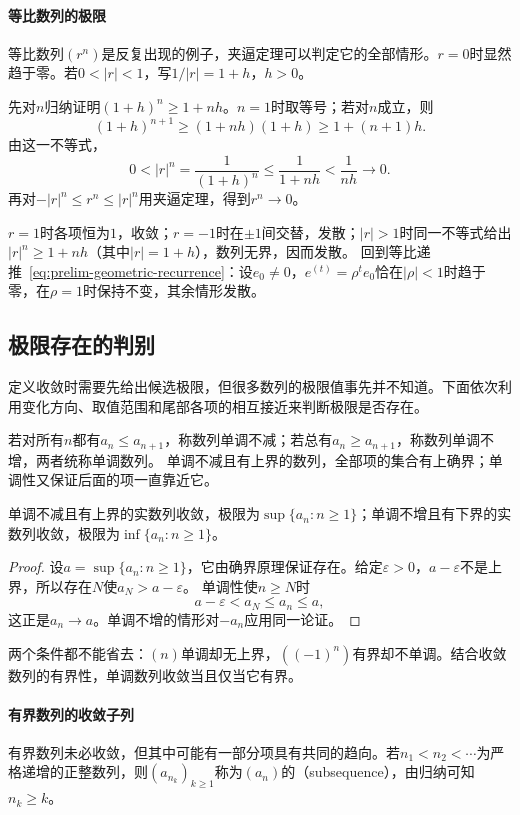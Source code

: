 \paragraph{等比数列的极限}
等比数列$(r^n)$是反复出现的例子，夹逼定理可以判定它的全部情形。$r=0$时显然趋于零。若$0<|r|<1$，写$1/|r|=1+h$，$h>0$。

先对$n$归纳证明$(1+h)^n\geq1+nh$。$n=1$时取等号；若对$n$成立，则
\[
 (1+h)^{n+1}\geq(1+nh)(1+h)\geq1+(n+1)h.
\]
由这一不等式，
\[
 0<|r|^n=\frac1{(1+h)^n}\leq\frac1{1+nh}<\frac1{nh}\to0.
\]
再对$-|r|^n\leq r^n\leq|r|^n$用夹逼定理，得到$r^n\to0$。

$r=1$时各项恒为$1$，收敛；$r=-1$时在$\pm1$间交替，发散；$|r|>1$时同一不等式给出$|r|^n\geq1+nh$（其中$|r|=1+h$），数列无界，因而发散。
回到等比递推~\eqref{eq:prelim-geometric-recurrence}：设$e_0\neq0$，$e^{(t)}=\rho^te_0$恰在$|\rho|<1$时趋于零，在$\rho=1$时保持不变，其余情形发散。

\subsection{极限存在的判别}
\label{sec:ru-limit-existence}

定义收敛时需要先给出候选极限，但很多数列的极限值事先并不知道。下面依次利用变化方向、取值范围和尾部各项的相互接近来判断极限是否存在。

若对所有$n$都有$a_n\leq a_{n+1}$，称数列单调不减；若总有$a_n\geq a_{n+1}$，称数列单调不增，两者统称单调数列。
单调不减且有上界的数列，全部项的集合有上确界；单调性又保证后面的项一直靠近它。
\begin{theorem}[单调有界收敛定理]
\label{thm:analysis-monotone-bounded-sequence}
单调不减且有上界的实数列收敛，极限为$\sup\{a_n:n\geq1\}$；单调不增且有下界的实数列收敛，极限为$\inf\{a_n:n\geq1\}$。
\end{theorem}
\begin{proof}
设$a=\sup\{a_n:n\geq1\}$，它由确界原理保证存在。给定$\varepsilon>0$，$a-\varepsilon$不是上界，所以存在$N$使$a_N>a-\varepsilon$。
单调性使$n\geq N$时
\[
 a-\varepsilon<a_N\leq a_n\leq a,
\]
这正是$a_n\to a$。单调不增的情形对$-a_n$应用同一论证。
\end{proof}
两个条件都不能省去：$(n)$单调却无上界，$((-1)^n)$有界却不单调。结合收敛数列的有界性，单调数列收敛当且仅当它有界。

\paragraph{有界数列的收敛子列}
有界数列未必收敛，但其中可能有一部分项具有共同的趋向。若$n_1<n_2<\cdots$为严格递增的正整数列，则$(a_{n_k})_{k\geq1}$称为$(a_n)$的（subsequence），由归纳可知$n_k\geq k$。


